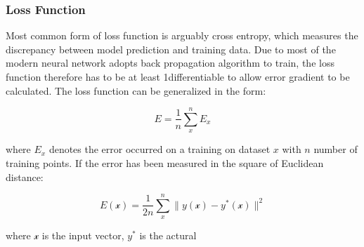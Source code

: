 \subsubsection{Loss Function}

Most common form of loss function is arguably cross entropy, which measures the discrepancy between model prediction and training data. Due to most of the modern neural network adopts back propagation algorithm to train, the loss function therefore has to be at least 1\textdegree differentiable to allow error gradient to be calculated. The loss function can be generalized in the form:

\begin{equation}
    E = \frac {1}{n} \sum_x^n E_x
\end{equation}

where $E_x$ denotes the error occurred on a training on dataset $x$ with $n$ number of training points. If the error has been measured in the square of Euclidean distance:

\begin{equation}
    E(\mathcal{x}) = \frac {1}{2n} \sum_x^n \parallel y(\mathcal{x}) - y^*(\mathcal{x}) \parallel^2 
\end{equation}

where $\mathcal{x}$ is the input vector, $y^*$ is the actural 
\par 
